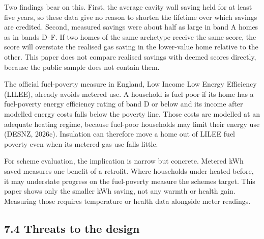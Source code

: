 \documentclass[11pt,a4paper]{article}
\begin{document}
Two findings bear on this. First, the average cavity wall saving held for at least five years, so these data give no reason to shorten the lifetime over which savings are credited. Second, measured savings were about half as large in band A homes as in bands D--F. If two homes of the same archetype receive the same score, the score will overstate the realised gas saving in the lower-value home relative to the other. This paper does not compare realised savings with deemed scores directly, because the public sample does not contain them.

The official fuel-poverty measure in England, Low Income Low Energy Efficiency (LILEE), already avoids metered use. A household is fuel poor if its home has a fuel-poverty energy efficiency rating of band D or below and its income after modelled energy costs falls below the poverty line. Those costs are modelled at an adequate heating regime, because fuel-poor households may limit their energy use (DESNZ, 2026c). Insulation can therefore move a home out of LILEE fuel poverty even when its metered gas use falls little.

For scheme evaluation, the implication is narrow but concrete. Metered kWh saved measures one benefit of a retrofit. Where households under-heated before, it may understate progress on the fuel-poverty measure the schemes target. This paper shows only the smaller kWh saving, not any warmth or health gain. Measuring those requires temperature or health data alongside meter readings.

\subsection*{7.4 Threats to the design}
\end{document}
